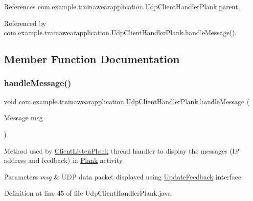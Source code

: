References com.\+example.\+trainawearapplication.\+Udp\+Client\+Handler\+Plank.\+parent.



Referenced by com.\+example.\+trainawearapplication.\+Udp\+Client\+Handler\+Plank.\+handle\+Message().



\subsection{Member Function Documentation}
\mbox{\label{classcom_1_1example_1_1trainawearapplication_1_1_udp_client_handler_plank_a2182425709c67eae734dd1f8dc2e228c}} 
\subsubsection{\texorpdfstring{handleMessage()}{handleMessage()}}
{\footnotesize\ttfamily void com.\+example.\+trainawearapplication.\+Udp\+Client\+Handler\+Plank.\+handle\+Message (\begin{DoxyParamCaption}\item[{Message}]{msg }\end{DoxyParamCaption})\hspace{0.3cm}{\ttfamily [inline]}}



Method used by \mbox{\hyperlink{classcom_1_1example_1_1trainawearapplication_1_1_client_listen_plank}{Client\+Listen\+Plank}} thread handler to display the messages (IP address and feedback) in \mbox{\hyperlink{classcom_1_1example_1_1trainawearapplication_1_1_plank}{Plank}} activity. 


\begin{DoxyParams}{Parameters}
{\em msg} & U\+DP data packet displayed using \mbox{\hyperlink{interfacecom_1_1example_1_1trainawearapplication_1_1_update_feedback}{Update\+Feedback}} interface \\
\hline
\end{DoxyParams}


Definition at line 45 of file Udp\+Client\+Handler\+Plank.\+java.


